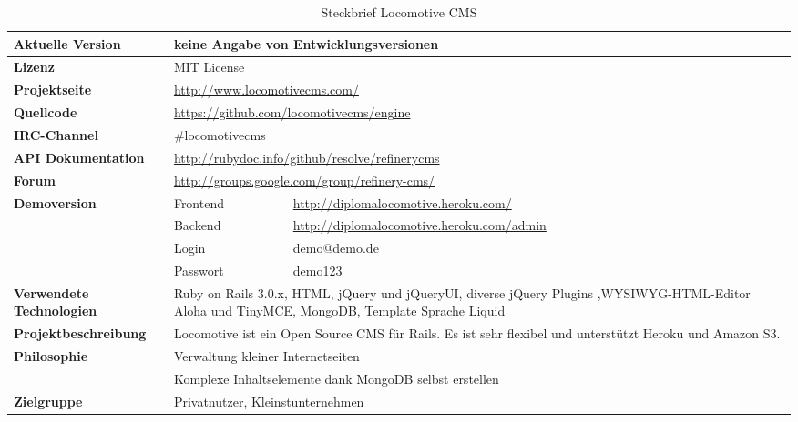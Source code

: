 \begin{table}[!h]
\caption{Steckbrief Locomotive CMS}
\begin{tabular}[!ht]{|l|l|l|}
\hline
\textbf{Aktuelle Version} & \multicolumn{2}{p{10cm}|}{keine Angabe von Entwicklungsversionen} \\
\hline
\textbf{Lizenz} & \multicolumn{2}{p{10cm}|}{MIT License} \\
\hline
\textbf{Projektseite} & \multicolumn{2}{p{10cm}|}{\href{http://www.locomotivecms.com/}{http://www.locomotivecms.com/}} \\
\hline
\textbf{Quellcode} & \multicolumn{2}{p{10cm}|}{\href{https://github.com/locomotivecms/engine}{https://github.com/locomotivecms/engine}} \\
\hline
\textbf{IRC-Channel} & \multicolumn{2}{p{10cm}|}{\#locomotivecms} \\
\hline
\textbf{API Dokumentation} & \multicolumn{2}{p{10cm}|}{\href{http://rubydoc.info/github/resolve/refinerycms}{http://rubydoc.info/github/resolve/refinerycms}} \\
\hline
\textbf{Forum} & \multicolumn{2}{p{10cm}|}{\href{http://groups.google.com/group/refinery-cms/}{http://groups.google.com/group/refinery-cms/}} \\
\hline
\textbf{Demoversion} & Frontend & \href{http://diplomalocomotive.heroku.com/}{http://diplomalocomotive.heroku.com/} \\
\cline{2-3}
& Backend & \href{http://diplomalocomotive.heroku.com/admin}{http://diplomalocomotive.heroku.com/admin} \\
\cline{2-3}
& Login & demo@demo.de \\
\cline{2-3}
& Passwort & demo123 \\
\hline
\textbf{Verwendete Technologien} & \multicolumn{2}{p{10cm}|}{Ruby on Rails 3.0.x, HTML, jQuery und jQueryUI, diverse jQuery Plugins ,WYSIWYG-HTML-Editor Aloha und TinyMCE, MongoDB, Template Sprache Liquid} \\
\hline
\textbf{Projektbeschreibung} & \multicolumn{2}{p{10cm}|}{Locomotive ist ein Open Source CMS für Rails. Es ist sehr flexibel und unterstützt Heroku und Amazon S3.} \\
\hline
\textbf{Philosophie} & \multicolumn{2}{p{10cm}|}{Verwaltung kleiner Internetseiten} \\
& \multicolumn{2}{p{10cm}|}{Komplexe Inhaltselemente dank MongoDB selbst erstellen}\\
\hline
\textbf{Zielgruppe} & \multicolumn{2}{p{10cm}|}{Privatnutzer, Kleinstunternehmen} \\
\hline
\end{tabular}
\end{table}
